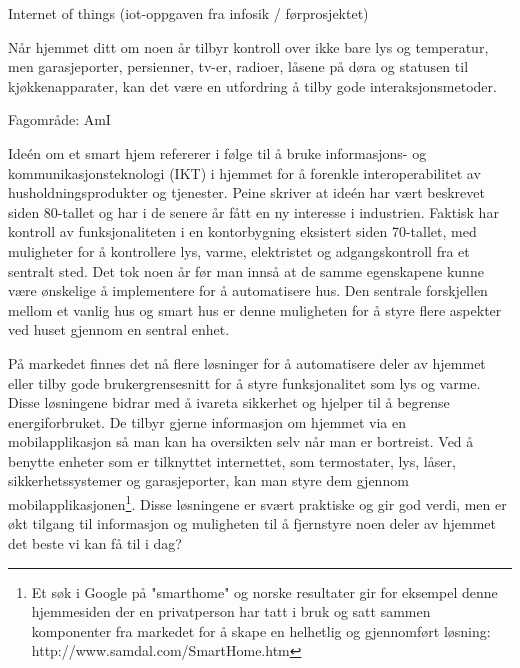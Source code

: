 {\color{blue}
Internet of things (iot-oppgaven fra infosik / førprosjektet)

Når hjemmet ditt om noen år tilbyr kontroll over ikke bare lys og temperatur, men garasjeporter, persienner, tv-er, radioer, låsene på døra og statusen til kjøkkenapparater, kan det være en utfordring å tilby gode interaksjonsmetoder.

Fagområde: AmI

Ideén om et smart hjem refererer i følge \citet{peine08} til å bruke informasjons- og kommunikasjonsteknologi (IKT) i hjemmet for å forenkle interoperabilitet av husholdningsprodukter og tjenester. Peine skriver at ideén har vært beskrevet siden 80-tallet og har i de senere år fått en ny interesse i industrien. Faktisk har kontroll av funksjonaliteten i en kontorbygning eksistert siden 70-tallet, med muligheter for å kontrollere lys, varme, elektristet og adgangskontroll fra et sentralt sted. Det tok noen år før man innså at de samme egenskapene kunne være ønskelige å implementere for å automatisere hus. Den sentrale forskjellen mellom et vanlig hus og smart hus er denne muligheten for å styre flere aspekter ved huset gjennom en sentral enhet.

På markedet finnes det nå flere løsninger for å automatisere deler av hjemmet eller tilby gode brukergrensesnitt for å styre funksjonalitet som lys og varme. Disse løsningene bidrar med å ivareta sikkerhet og hjelper til å begrense energiforbruket. De tilbyr gjerne informasjon om hjemmet via en mobilapplikasjon så man kan ha oversikten selv når man er bortreist. Ved å benytte enheter som er tilknyttet internettet, som termostater, lys, låser, sikkerhetssystemer og garasjeporter, kan man styre dem gjennom mobilapplikasjonen\footnote{Et søk i Google på "smarthome" og norske resultater gir for eksempel denne hjemmesiden der en privatperson har tatt i bruk og satt sammen komponenter fra markedet for å skape en helhetlig og gjennomført løsning: http://www.samdal.com/SmartHome.htm}. Disse løsningene er svært praktiske og gir god verdi, men er økt tilgang til informasjon og muligheten til å fjernstyre noen deler av hjemmet det beste vi kan få til i dag?

}
